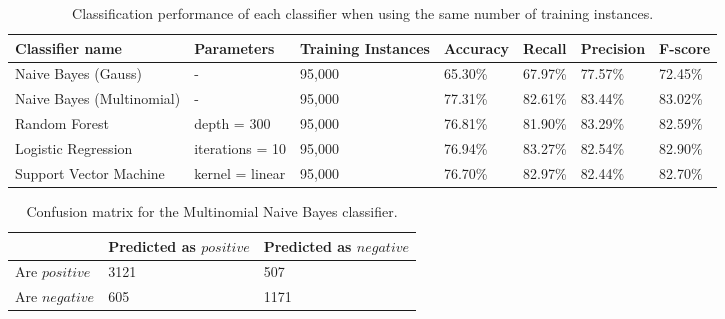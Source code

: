 \begin{table}
\centering
\caption{Classification performance of each classifier when using the same number of training instances.}
\begin{tabular}{ |p{3cm}||p{3cm}|p{2cm}|p{1.5cm}|p{1.5cm}|p{1.5cm}|p{1.5cm}| }
 \hline
 Classifier name &       Parameters &    Training Instances &Accuracy &  Recall &     Precision& F-score \\
 \hline
 Naive Bayes (Gauss)        &-&     95,000&                 65.30\%& 67.97\%&       77.57\%& 72.45\%\\
  \hline
 Naive Bayes (Multinomial)  &-&     95,000& 77.31\%&        82.61\%&       83.44\%& 83.02\%\\
  \hline
 Random Forest              &depth = 300&            95,000&76.81\%&  81.90\%&     83.29\%& 82.59\%\\
  \hline
 Logistic Regression        &iterations = 10&   95,000&    76.94\%&        83.27\%&   82.54\%& 82.90\%\\
  \hline
 Support Vector Machine     &kernel = linear&   95,000&     76.70\%& 82.97\%&  82.44\%& 82.70\%\\
 \hline
\end{tabular}
\label{tab:evaluations_euqal}
\end{table}
\begin{table}
\centering
\caption{Confusion matrix for the Multinomial Naive Bayes classifier.}
\begin{tabular}{ |p{3cm}||p{3cm}|p{3cm}| }
 \hline
  &          Predicted as $positive$ &Predicted as $negative$  \\
 \hline
 Are $positive$        & 3121&            507\\
  \hline
 Are $negative$  &605&                     1171\\
 \hline

\end{tabular}
\label{tab:evaluations_conf}
\end{table}
